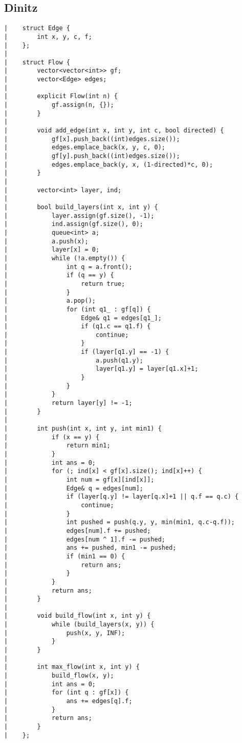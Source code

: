 \documentclass[a4paper, 10pt]{article}
\begin{document}
\begin{center}
\section*{Dinitz}
\begin{verbatim}
|    struct Edge {
|        int x, y, c, f;
|    };
|    
|    struct Flow {
|        vector<vector<int>> gf;
|        vector<Edge> edges;
|    
|        explicit Flow(int n) {
|            gf.assign(n, {});
|        }
|    
|        void add_edge(int x, int y, int c, bool directed) {
|            gf[x].push_back((int)edges.size());
|            edges.emplace_back(x, y, c, 0);
|            gf[y].push_back((int)edges.size());
|            edges.emplace_back(y, x, (1-directed)*c, 0);
|        }
|    
|        vector<int> layer, ind;
|    
|        bool build_layers(int x, int y) {
|            layer.assign(gf.size(), -1);
|            ind.assign(gf.size(), 0);
|            queue<int> a;
|            a.push(x);
|            layer[x] = 0;
|            while (!a.empty()) {
|                int q = a.front();
|                if (q == y) {
|                    return true;
|                }
|                a.pop();
|                for (int q1_ : gf[q]) {
|                    Edge& q1 = edges[q1_];
|                    if (q1.c == q1.f) {
|                        continue;
|                    }
|                    if (layer[q1.y] == -1) {
|                        a.push(q1.y);
|                        layer[q1.y] = layer[q1.x]+1;
|                    }
|                }
|            }
|            return layer[y] != -1;
|        }
|    
|        int push(int x, int y, int min1) {
|            if (x == y) {
|                return min1;
|            }
|            int ans = 0;
|            for (; ind[x] < gf[x].size(); ind[x]++) {
|                int num = gf[x][ind[x]];
|                Edge& q = edges[num];
|                if (layer[q.y] != layer[q.x]+1 || q.f == q.c) {
|                    continue;
|                }
|                int pushed = push(q.y, y, min(min1, q.c-q.f));
|                edges[num].f += pushed;
|                edges[num ^ 1].f -= pushed;
|                ans += pushed, min1 -= pushed;
|                if (min1 == 0) {
|                    return ans;
|                }
|            }
|            return ans;
|        }
|    
|        void build_flow(int x, int y) {
|            while (build_layers(x, y)) {
|                push(x, y, INF);
|            }
|        }
|    
|        int max_flow(int x, int y) {
|            build_flow(x, y);
|            int ans = 0;
|            for (int q : gf[x]) {
|                ans += edges[q].f;
|            }
|            return ans;
|        }
|    };
\end{verbatim}


\end{center}
\end{document}
